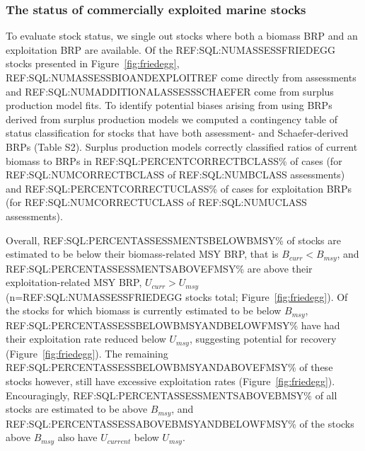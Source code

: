 
\subsubsection*{The status of commercially exploited marine stocks }
To evaluate stock status, we single out stocks where both a biomass
BRP and an exploitation BRP are available. Of the
REF:SQL:NUMASSESSFRIEDEGG stocks presented in
Figure~\ref{fig:friedegg}, REF:SQL:NUMASSESSBIOANDEXPLOITREF come
directly from assessments and REF:SQL:NUMADDITIONALASSESSSCHAEFER come
from surplus production model fits. To identify potential biases
arising from using BRPs derived from surplus production models we
computed a contingency table of status classification for stocks that
have both assessment- and Schaefer-derived BRPs (Table S2). Surplus
production models correctly classified ratios of current biomass to
BRPs in REF:SQL:PERCENTCORRECTBCLASS\% of cases (for
REF:SQL:NUMCORRECTBCLASS of REF:SQL:NUMBCLASS assessments) and
REF:SQL:PERCENTCORRECTUCLASS\% of cases for exploitation BRPs (for
REF:SQL:NUMCORRECTUCLASS of REF:SQL:NUMUCLASS assessments).



Overall, REF:SQL:PERCENTASSESSMENTSBELOWBMSY\% of stocks are estimated to be below
their biomass-related MSY BRP, that is $B_{curr}<B_{msy}$, and
REF:SQL:PERCENTASSESSMENTSABOVEFMSY\% are above their
exploitation-related MSY BRP, $U_{curr}>U_{msy}$
(n=REF:SQL:NUMASSESSFRIEDEGG stocks total; Figure~\ref{fig:friedegg}).
Of the stocks for which biomass is currently estimated to be below $B_{msy}$,
REF:SQL:PERCENTASSESSBELOWBMSYANDBELOWFMSY\% have had their
exploitation rate reduced below $U_{msy}$, suggesting potential for
recovery (Figure~\ref{fig:friedegg}). The remaining
REF:SQL:PERCENTASSESSBELOWBMSYANDABOVEFMSY\% of these stocks however,
still have excessive exploitation rates (Figure~\ref{fig:friedegg}).
Encouragingly, REF:SQL:PERCENTASSESSMENTSABOVEBMSY\% of all stocks are
estimated to be above $B_{msy}$, and REF:SQL:PERCENTASSESSABOVEBMSYANDBELOWFMSY\% of the
stocks above $B_{msy}$ also have $U_{current}$ below $U_{msy}$. 

